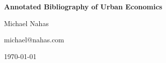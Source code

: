 \documentclass[12pt]{article}
\begin{document}
\begin{center}
   {\Large\textbf{Annotated Bibliography of Urban Economics}}
\medskip

   {\large   Michael Nahas
\medskip

	michael@nahas.com
\medskip

           \today
   }
\end{center}
\nocite{*}



\end{document}
